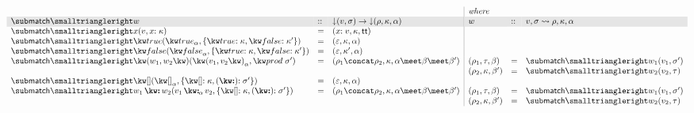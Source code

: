$\begin{array}{lll|lll}
   \arrayrulecolor{lightgray}
   &&&\textit{where}
   \\
   \rowcolor{verylightgray}
   \matchFwdF{w} &::& \Below{(v,\sigma)} \to \Below{(\rho,\kappa, \alpha)}
   &w &::& v, \sigma \match \rho, \kappa, \alpha
   \\
   \matchFwdF{x}(v, \elimVar{x}{\kappa})
   &=&
   (\bind{x}{v}, \kappa, \TT)
   \\
   \matchFwdF{\matchTrue}(\annTrue{\alpha}, \elimBool{\kappa}{\kappa'})
   &=&
   (\seqEmpty, \kappa, \alpha)
   \\
   \matchFwdF{\matchFalse}(\annFalse{\alpha}, \elimBool{\kappa}{\kappa'})
   &=&
   (\seqEmpty, \kappa', \alpha)
   \\
   \matchFwdF{\matchPair{w_1}{w_2}}(\annPair{v_1}{v_2}{\alpha}, \elimProd{\sigma'})
   &=&
   (\rho_1 \concat \rho_2, \kappa, \alpha \meet \beta \meet \beta')
   &
   (\rho_1, \tau, \beta) &=& \matchFwdF{w_1}(v_1,\sigma')
   \\
   &&&
   (\rho_2, \kappa, \beta') &=& \matchFwdF{w_2}(v_2,\tau)
   \\
   \matchFwdF{\matchNil}(\annNil{\alpha}, \elimList{\kappa}{\sigma'})
   &=&
   (\seqEmpty, \kappa, \alpha)
   \\
   \matchFwdF{\matchCons{w_1}{w_2}}(\annCons{v_1}{v_2}{\alpha}, \elimList{\kappa}{\sigma'})
   &=&
   (\rho_1 \concat \rho_2, \kappa, \alpha \meet \beta \meet \beta')
   &
   (\rho_1, \tau, \beta) &=& \matchFwdF{w_1}(v_1,\sigma')
   \\
   &&&
   (\rho_2, \kappa, \beta') &=& \matchFwdF{w_2}(v_2,\tau)
\end{array}$\\[3mm]

